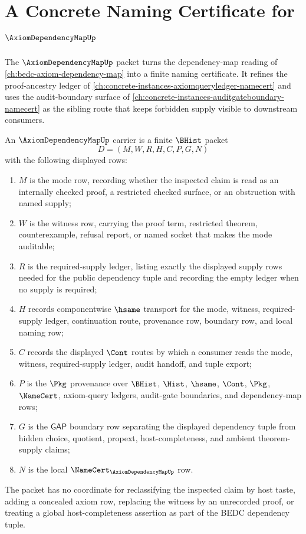 \chapter{A Concrete Naming Certificate for $\AxiomDependencyMapUp$}
\label{ch:concrete-instances-axiomdependencymap-namecert}

The $\AxiomDependencyMapUp$ packet turns the dependency-map reading of \autoref{ch:bedc-axiom-dependency-map} into a finite naming certificate. It refines the proof-ancestry ledger of \autoref{ch:concrete-instances-axiomqueryledger-namecert} and uses the audit-boundary surface of \autoref{ch:concrete-instances-auditgateboundary-namecert} as the sibling route that keeps forbidden supply visible to downstream consumers.

\begin{definition}
\label{def:axiom-dependency-map-packet-carrier}
An $\AxiomDependencyMapUp$ carrier is a finite $\BHist$ packet
$$
D=(M,W,R,H,C,P,G,N)
$$
with the following displayed rows:
\begin{enumerate}
\item $M$ is the mode row, recording whether the inspected claim is read as an internally checked proof, a restricted checked surface, or an obstruction with named supply;
\item $W$ is the witness row, carrying the proof term, restricted theorem, counterexample, refusal report, or named socket that makes the mode auditable;
\item $R$ is the required-supply ledger, listing exactly the displayed supply rows needed for the public dependency tuple and recording the empty ledger when no supply is required;
\item $H$ records componentwise $\hsame$ transport for the mode, witness, required-supply ledger, continuation route, provenance row, boundary row, and local naming row;
\item $C$ records the displayed $\Cont$ routes by which a consumer reads the mode, witness, required-supply ledger, audit handoff, and tuple export;
\item $P$ is the $\Pkg$ provenance over $\BHist$, $\Hist$, $\hsame$, $\Cont$, $\Pkg$, $\NameCert$, axiom-query ledgers, audit-gate boundaries, and dependency-map rows;
\item $G$ is the $\mathsf{GAP}$ boundary row separating the displayed dependency tuple from hidden choice, quotient, propext, host-completeness, and ambient theorem-supply claims;
\item $N$ is the local $\NameCert_{\AxiomDependencyMapUp}$ row.
\end{enumerate}
The packet has no coordinate for reclassifying the inspected claim by host taste, adding a concealed axiom row, replacing the witness by an unrecorded proof, or treating a global host-completeness assertion as part of the BEDC dependency tuple.
\end{definition}

